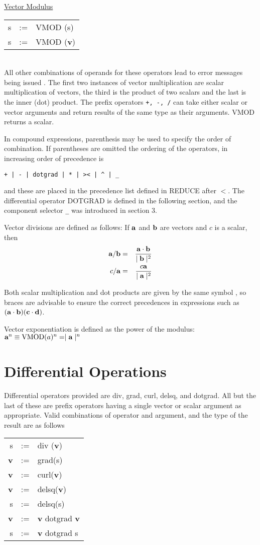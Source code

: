 \underline{Vector Modulus}\\
\begin{tabular}{rcl}
   s    &:=& VMOD (s)\\
   s    &:=& VMOD ({\bf v}) \\
\end{tabular} \\

All other combinations of operands for these operators lead to error 
messages being issued .  The first two instances of vector
multiplication are scalar multiplication of vectors, the third is the
product of two scalars and the last is the inner (dot) product.  The
prefix operators  {\tt +, -, /} can take either scalar or vector
arguments and return results of the same type as their arguments. 
VMOD returns a scalar.

In compound expressions, parenthesis may be used to specify the order of 
combination.  If parentheses are omitted the ordering of the
operators, in increasing order of precedence is
\begin{verbatim}
+ | - | dotgrad | * | >< | ^ | _
\end{verbatim}
and these are placed in the precedence list defined in REDUCE \cite{r1}
 after $<$.
The differential operator 
DOTGRAD is defined in the
following section, and the component selector {\tt \_} was introduced in
section 3.

Vector divisions are defined as follows:  If ${\bf a}$ and ${\bf b}$ are
 vectors and $c$ is a scalar, then
\begin{eqnarray*}
{\bf a} /  {\bf b} & = &  \frac{{\bf a} \cdot {\bf b}}{  \mid {\bf b} 
\mid^2}\\
c / {\bf a}   & = &  \frac{c {\bf a}  }{ \mid {\bf a} \mid^2}
\end{eqnarray*}

Both scalar multiplication and dot products are given by the same symbol
, so braces are advisable to ensure the correct
precedences in expressions such as $({\bf a} \cdot {\bf b}) 
({\bf c} \cdot {\bf d})$.

Vector exponentiation is defined as the power of the modulus:\\
${\bf a}^n \equiv  {\rm VMOD}(a)^n =   \mid {\bf a} \mid^n$
\section{Differential Operations}
Differential operators provided are div, grad, curl, delsq, and dotgrad.
All but the last of these are prefix operators having a single
vector or scalar argument as appropriate.  Valid combinations of 
operator and argument, and the type of the result are as follows
\begin{tabular}{rcl}
s & := & div ({\bf v})  \\
{\bf v} & := & grad(s) \\
{\bf v} & := & curl({\bf v})  \\
{\bf v} & := & delsq({\bf v}) \\
 s  & := & delsq(s) \\
{\bf v} & := & {\bf v}  dotgrad {\bf v}  \\
 s & := & {\bf v}  dotgrad  s 
\end{tabular}

